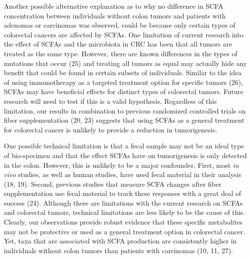 \documentclass[11pt,]{article}
\begin{document}
Another possible alternative explanation as to why no difference in SCFA
concentration between individuals without colon tumors and patients with
adenomas or carcinomas was observed, could be because only certain types
of colorectal cancers are affected by SCFAs. One limitation of current
research into the effect of SCFAs and the microbiota in CRC has been
that all tumors are treated as the same type. However, there are known
differences in the types of mutations that occur (25) and treating all
tumors as equal may actually hide any benefit that could be found in
certain subsets of individuals. Similar to the idea of using
immunotherapy as a targeted treatment option for specific tumors (26),
SCFAs may have beneficial effects for distinct types of colorectal
tumors. Future research will need to test if this is a valid hypothesis.
Regardless of this limitation, our results in combination to previous
randomized controlled trials on fiber supplementation (20, 23) suggests
that using SCFAs as a general treatment for colorectal cancer is
unlikely to provide a reduction in tumorigenesis.

One possible technical limitation is that a fecal sample may not be an
ideal type of bio-specimen and that the effect SCFAs have on
tumorigenesis is only detected in the colon. However, this is unlikely
to be a major confounder. First, most \emph{in vivo} studies, as well as
human studies, have used fecal material in their analysis (18, 19).
Second, previous studies that measure SCFA changes after fiber
supplementation use fecal material to track these responses with a great
deal of success (24). Although there are limitations with the current
research on SCFAs and colorectal tumors, technical limitations are less
likely to be the cause of this. Clearly, our observations provide robust
evidence that these specific metabolites may not be protective or used
as a general treatment option in colorectal cancer. Yet, taxa that are
associated with SCFA production are consistently higher in individuals
without colon tumors than patients with carcinomas (10, 11, 27).
\end{document}
